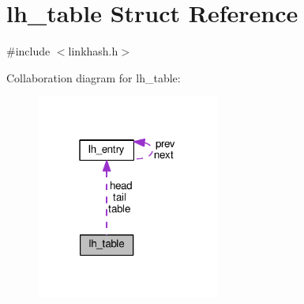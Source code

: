\hypertarget{structlh__table}{}\section{lh\+\_\+table Struct Reference}
\label{structlh__table}


{\ttfamily \#include $<$linkhash.\+h$>$}



Collaboration diagram for lh\+\_\+table\+:
\nopagebreak
\begin{figure}[H]
\begin{center}
\leavevmode
\includegraphics[width=171pt]{structlh__table__coll__graph}
\end{center}
\end{figure}
